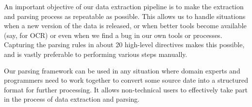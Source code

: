 An important objective of our data extraction pipeline is to make the extraction and parsing process as repeatable as possible. This allows us to handle situations when a new version of the data is released, or when better tools become available (say, for OCR) or even when we find a bug in our own tools or processes. Capturing the parsing rules in about 20 high-level directives makes this possible, and is vastly preferable to performing various steps manually.

Our parsing framework can be used in any situation where domain experts and programmers need to work together to convert some source date into a structured format for further processing. It allows non-technical users to effectively take part in the process of data extraction and parsing.

